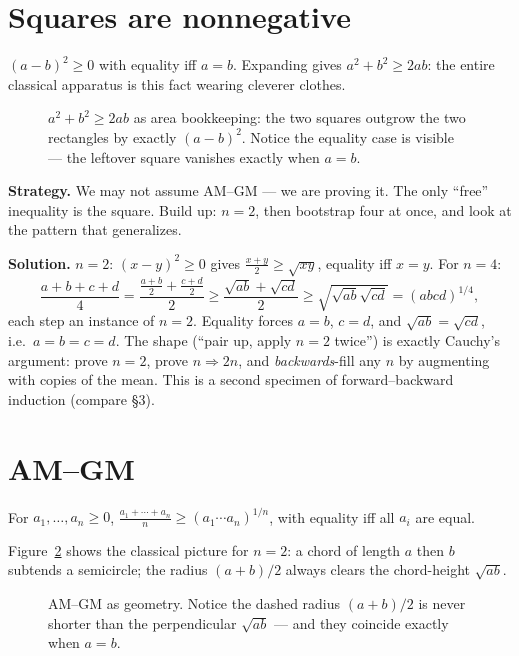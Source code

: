 \section{Squares are nonnegative}

$(a-b)^2 \ge 0$ with equality iff $a=b$. Expanding gives
$a^2 + b^2 \ge 2ab$: the entire classical apparatus is this fact wearing
cleverer clothes.

\begin{figure}[ht]\centering

\caption{$a^2+b^2 \ge 2ab$ as area bookkeeping: the two squares outgrow
the two rectangles by exactly $(a-b)^2$. Notice the equality case is
visible --- the leftover square vanishes exactly when $a = b$.}
\label{fig:sqsum}
\end{figure}

\begin{example}[AM--GM for $n=4$, from scratch]
\textbf{Strategy.} We may not assume AM--GM --- we are proving it. The
only ``free'' inequality is the square. Build up: $n=2$, then bootstrap
four at once, and look at the pattern that generalizes.

\textbf{Solution.} $n=2$: $(x-y)^2\ge0$ gives
$\frac{x+y}{2}\ge\sqrt{xy}$, equality iff $x=y$. For $n=4$:
\[
\frac{a+b+c+d}{4} = \frac{\frac{a+b}{2}+\frac{c+d}{2}}{2}
\ge \frac{\sqrt{ab}+\sqrt{cd}}{2} \ge \sqrt{\sqrt{ab}\sqrt{cd}}
= (abcd)^{1/4},
\]
each step an instance of $n=2$. Equality forces $a=b$, $c=d$, and
$\sqrt{ab}=\sqrt{cd}$, i.e.\ $a=b=c=d$. The shape (``pair up, apply
$n=2$ twice'') is exactly Cauchy's argument: prove $n=2$, prove
$n \Rightarrow 2n$, and \emph{backwards}-fill any $n$ by augmenting with
copies of the mean. This is a second specimen
of forward--backward induction (compare \S3).
\end{example}

\section{AM--GM}

\begin{theorem}[AM--GM]
For $a_1,\dots,a_n \ge 0$,
$\frac{a_1+\cdots+a_n}{n} \ge (a_1\cdots a_n)^{1/n}$, with equality iff
all $a_i$ are equal.
\end{theorem}

Figure~\ref{fig:amgm} shows the classical picture for $n=2$: a chord of
length $a$ then $b$ subtends a semicircle; the radius $(a+b)/2$ always
clears the chord-height $\sqrt{ab}$.
\begin{figure}[ht]\centering

\caption{AM--GM as geometry. Notice the dashed radius $(a+b)/2$ is never
shorter than the perpendicular $\sqrt{ab}$ --- and they coincide exactly
when $a=b$.}
\label{fig:amgm}
\end{figure}

